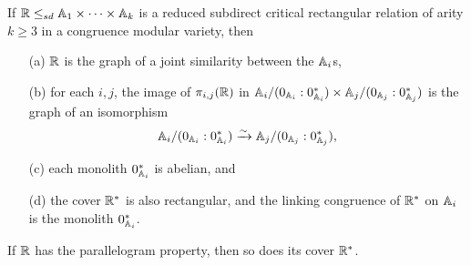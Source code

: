\documentclass[letterpaper,11pt]{article}
\begin{document}
\begin{thm}\label{rectangular-structure} If $\mathbb{R} \le_{sd} \mathbb{A}_1 \times \cdots \times \mathbb{A}_k$ is a reduced subdirect critical rectangular relation of arity $k \ge 3$ in a congruence modular variety, then
\begin{itemize}
\item[(a)] $\mathbb{R}$ is the graph of a joint similarity between the $\mathbb{A}_i$s,

\item[(b)] for each $i,j$, the image of $\pi_{i,j}(\mathbb{R})$ in $\mathbb{A}_i/(0_{\mathbb{A}_i}:0_{\mathbb{A}_i}^*) \times \mathbb{A}_j/(0_{\mathbb{A}_j}:0_{\mathbb{A}_j}^*)$ is the graph of an isomorphism
\[
\mathbb{A}_i/(0_{\mathbb{A}_i}:0_{\mathbb{A}_i}^*) \xrightarrow{\sim} \mathbb{A}_j/(0_{\mathbb{A}_j}:0_{\mathbb{A}_j}^*),
\]

\item[(c)] each monolith $0_{\mathbb{A}_i}^*$ is abelian, and

\item[(d)] the cover $\mathbb{R}^*$ is also rectangular, and the linking congruence of $\mathbb{R}^*$ on $\mathbb{A}_i$ is the monolith $0_{\mathbb{A}_i}^*$.
\end{itemize}
If $\mathbb{R}$ has the parallelogram property, then so does its cover $\mathbb{R}^*$.
\end{thm}
\end{document}
